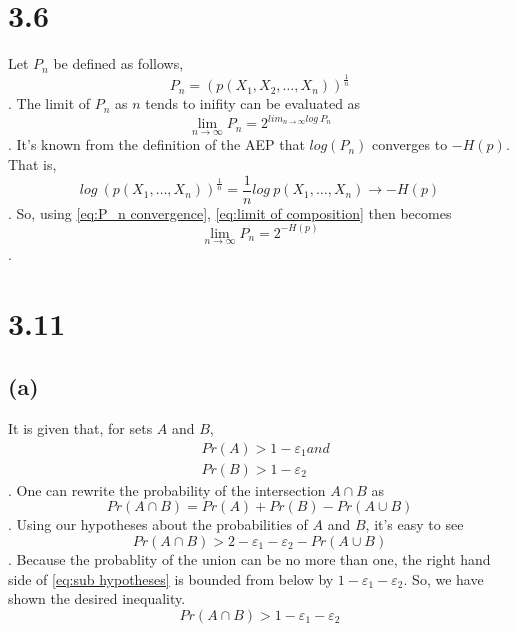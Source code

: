 \documentclass[12pt]{article}
\begin{document}
\section*{3.6}

Let $P_n$ be defined as follows,
\begin{equation}
    P_n = (p(X_1,X_2,\dots,X_n))^{\frac{1}{n}}
    \label{eq:defn P_n}
\end{equation}
. The limit of $P_n$ as $n$ tends to inifity can be evaluated as
\begin{equation}
    \lim_{n\to \infty} P_n = 2^{lim_{n\to\infty}log\ P_n}
    \label{eq:limit of composition}
\end{equation}
. It's known from the definition of the AEP that $log(P_n)$ converges to
$-H(p)$. That is,
\begin{equation}
    log\ (p(X_1,\dots,X_n))^{\frac{1}{n}} 
        = \frac{1}{n} log\ p(X_1,\dots,X_n) \rightarrow -H(p)
    \label{eq:P_n convergence}
\end{equation}
. So, using \ref{eq:P_n convergence}, \ref{eq:limit of composition} then
becomes 
\begin{equation}
    \lim_{n\to\infty} P_n = 2^{-H(p)}
    \label{eq:P_n limit}
\end{equation}.

\section*{3.11}

\subsection*{(a)}

It is given that, for sets $A$ and $B$,
\begin{align}
    &Pr(A) > 1 - \varepsilon_1 and \\
    &Pr(B) > 1 - \varepsilon_2
\end{align}
. One can rewrite the probability of the intersection $A\cap B$ as
\begin{equation}
    Pr(A\cap B) = Pr(A) + Pr(B) - Pr(A\cup B)
    \label{eq:pr A intersect B}
\end{equation}
. Using our hypotheses about the probabilities of $A$ and $B$, it's easy
to see
\begin{equation}
    Pr(A\cap B) > 2 - \varepsilon_1 - \varepsilon_2 - Pr(A\cup B)
    \label{eq:sub hypotheses}
\end{equation}
. Because the probablity of the union can be no more than one, the right
hand side of \ref{eq:sub hypotheses} is bounded from below by
$1-\varepsilon_1-\varepsilon_2$. So, we have shown the desired inequality.
\begin{equation}
    Pr(A\cap B) > 1 - \varepsilon_1 - \varepsilon_2
    \label{eq:3.11a}
\end{equation}
\end{document}

